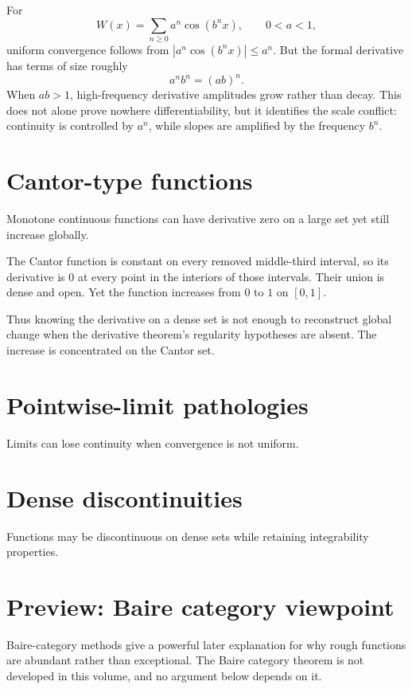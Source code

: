\begin{example}\label{ex:ii15-expand-01}
For
\[
W(x)=\sum_{n\ge0}a^n\cos(b^n x),\qquad 0<a<1,
\]
uniform convergence follows from \(|a^n\cos(b^nx)|\le a^n\). But the formal
derivative has terms of size roughly
\[
a^n b^n=(ab)^n.
\]
When \(ab>1\), high-frequency derivative amplitudes grow rather than decay.
This does not alone prove nowhere differentiability, but it identifies the
scale conflict: continuity is controlled by \(a^n\), while slopes are
amplified by the frequency \(b^n\).
\end{example}
\section{Cantor-type functions}
Monotone continuous functions can have derivative zero on a large set yet still increase globally.


\begin{example}\label{ex:ii15-expand-02}
The Cantor function is constant on every removed middle-third interval, so its
derivative is \(0\) at every point in the interiors of those intervals. Their
union is dense and open. Yet the function increases from \(0\) to \(1\) on
\([0,1]\).

Thus knowing the derivative on a dense set is not enough to reconstruct global
change when the derivative theorem's regularity hypotheses are absent. The
increase is concentrated on the Cantor set.
\end{example}
\section{Pointwise-limit pathologies}
Limits can lose continuity when convergence is not uniform.

\section{Dense discontinuities}
Functions may be discontinuous on dense sets while retaining integrability properties.

\section{Preview: Baire category viewpoint}
Baire-category methods give a powerful later explanation for why rough functions are abundant rather than exceptional. The Baire category theorem is not developed in this volume, and no argument below depends on it.

